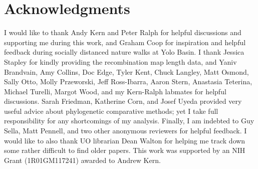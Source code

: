 \documentclass[9pt,lineno]{elife}
\begin{document}
\section{Acknowledgments}

I would like to thank Andy Kern and Peter Ralph for helpful discussions and
supporting me during this work, and Graham Coop for inspiration and helpful
feedback during socially distanced nature walks at Yolo Basin. I thank Jessica
Stapley for kindly providing the recombination map length data, and Yaniv
Brandvain, Amy Collins, Doc Edge, Tyler Kent, Chuck Langley, Matt Osmond, Sally
Otto, Molly Przeworski, Jeff Ross-Ibarra, Aaron Stern, Anastasia Teterina,
Michael Turelli, Margot Wood, and my Kern-Ralph labmates for helpful
discussions. Sarah Friedman, Katherine Corn, and Josef Uyeda provided very
useful advice about phylogenetic comparative methods; yet I take full
responsibility for any shortcomings of my analysis. Finally, I am indebted to
Guy Sella, Matt Pennell, and two other anonymous reviewers for helpful
feedback. I would like to also thank UO librarian Dean Walton for helping me
track down some rather difficult to find older papers.  This work was supported
by an NIH Grant (1R01GM117241) awarded to Andrew Kern.



\end{document}
